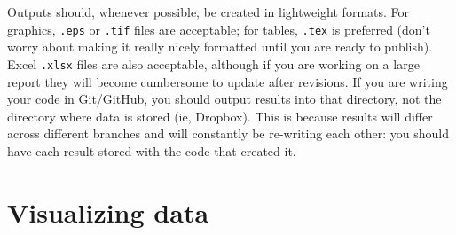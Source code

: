 Outputs should, whenever possible, be created in lightweight formats.
For graphics, \texttt{.eps} or \texttt{.tif} files are acceptable;
for tables, \texttt{.tex} is preferred (don't worry about making it
really nicely formatted until you are ready to publish).
Excel \texttt{.xlsx} files are also acceptable,
although if you are working on a large report
they will become cumbersome to update after revisions.
If you are writing your code in Git/GitHub,
you should output results into that directory,
not the directory where data is stored (ie, Dropbox).
This is because results will differ across different branches
and will constantly be re-writing each other:
you should have each result stored with the code that created it.


\section{Visualizing data}

